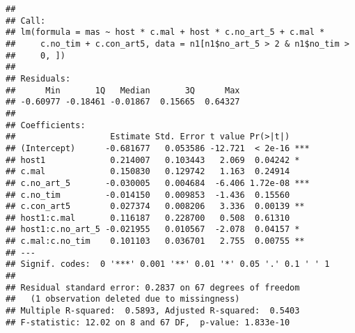 \documentclass[]{article}
\newenvironment{Shaded}{\begin{snugshade}}{\end{snugshade}}
\newcommand{\KeywordTok}[1]{\textcolor[rgb]{0.13,0.29,0.53}{\textbf{#1}}}
\newcommand{\DataTypeTok}[1]{\textcolor[rgb]{0.13,0.29,0.53}{#1}}
\newcommand{\DecValTok}[1]{\textcolor[rgb]{0.00,0.00,0.81}{#1}}
\newcommand{\StringTok}[1]{\textcolor[rgb]{0.31,0.60,0.02}{#1}}
\newcommand{\OperatorTok}[1]{\textcolor[rgb]{0.81,0.36,0.00}{\textbf{#1}}}
\newcommand{\NormalTok}[1]{#1}
\begin{document}
\begin{verbatim}
## 
## Call:
## lm(formula = mas ~ host * c.mal + host * c.no_art_5 + c.mal * 
##     c.no_tim + c.con_art5, data = n1[n1$no_art_5 > 2 & n1$no_tim > 
##     0, ])
## 
## Residuals:
##      Min       1Q   Median       3Q      Max 
## -0.60977 -0.18461 -0.01867  0.15665  0.64327 
## 
## Coefficients:
##                   Estimate Std. Error t value Pr(>|t|)    
## (Intercept)      -0.681677   0.053586 -12.721  < 2e-16 ***
## host1             0.214007   0.103443   2.069  0.04242 *  
## c.mal             0.150830   0.129742   1.163  0.24914    
## c.no_art_5       -0.030005   0.004684  -6.406 1.72e-08 ***
## c.no_tim         -0.014150   0.009853  -1.436  0.15560    
## c.con_art5        0.027374   0.008206   3.336  0.00139 ** 
## host1:c.mal       0.116187   0.228700   0.508  0.61310    
## host1:c.no_art_5 -0.021955   0.010567  -2.078  0.04157 *  
## c.mal:c.no_tim    0.101103   0.036701   2.755  0.00755 ** 
## ---
## Signif. codes:  0 '***' 0.001 '**' 0.01 '*' 0.05 '.' 0.1 ' ' 1
## 
## Residual standard error: 0.2837 on 67 degrees of freedom
##   (1 observation deleted due to missingness)
## Multiple R-squared:  0.5893, Adjusted R-squared:  0.5403 
## F-statistic: 12.02 on 8 and 67 DF,  p-value: 1.833e-10
\end{verbatim}

\begin{Shaded}
\end{Shaded}
\end{document}
